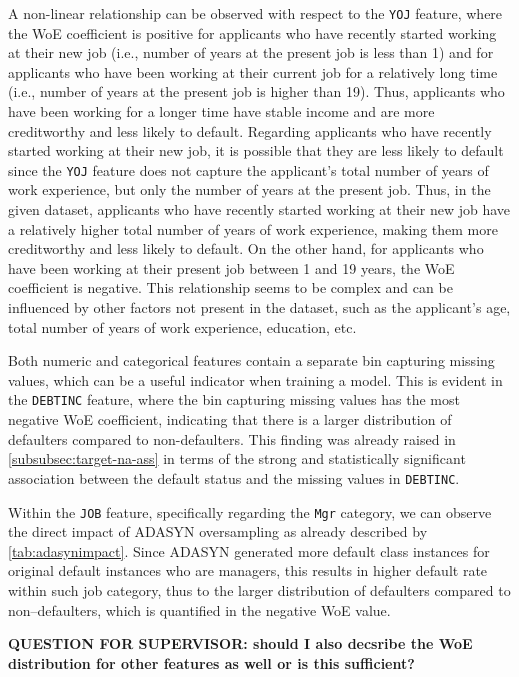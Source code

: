 A non-linear relationship can be observed with respect to the \texttt{YOJ} feature, where the WoE coefficient is positive for applicants who have recently started working at their new job (i.e., number of years at the present job is less than 1) and for applicants who have been working at their current job for a relatively long time (i.e., number of years at the present job is higher than 19).
Thus, applicants who have been working for a longer time have stable income and are more creditworthy and less likely to default.
Regarding applicants who have recently started working at their new job, it is possible that they are less likely to default since the \texttt{YOJ} feature does not capture the applicant's total number of years of work experience, but only the number of years at the present job.
Thus, in the given dataset, applicants who have recently started working at their new job have a relatively higher total number of years of work experience, making them more creditworthy and less likely to default. On the other hand, for applicants who have been working at their present job between 1 and 19 years, the WoE coefficient is negative.
This relationship seems to be complex and can be influenced by other factors not present in the dataset, such as the applicant's age, total number of years of work experience, education, etc.

Both numeric and categorical features contain a separate bin capturing missing values, which can be a useful indicator when training a model. This is evident in the \texttt{DEBTINC} feature, where the bin capturing missing values has the most negative WoE coefficient, indicating that there is a larger distribution of defaulters compared to non-defaulters.
This finding was already raised in \autoref{subsubsec:target-na-ass} in terms of the strong and statistically significant association between the default status and the missing values in \texttt{DEBTINC}.

Within the \texttt{JOB} feature, specifically regarding the \texttt{Mgr} category, we can observe the direct impact of ADASYN oversampling as already described by \autoref{tab:adasynimpact}.
Since ADASYN generated more default class instances for original default instances who are managers, this results in higher default rate within such job category, thus to the larger distribution of defaulters compared to non--defaulters, which is quantified in the negative WoE value.


\textbf{QUESTION FOR SUPERVISOR: should I also decsribe the WoE distribution for other features as well or is this sufficient?}


